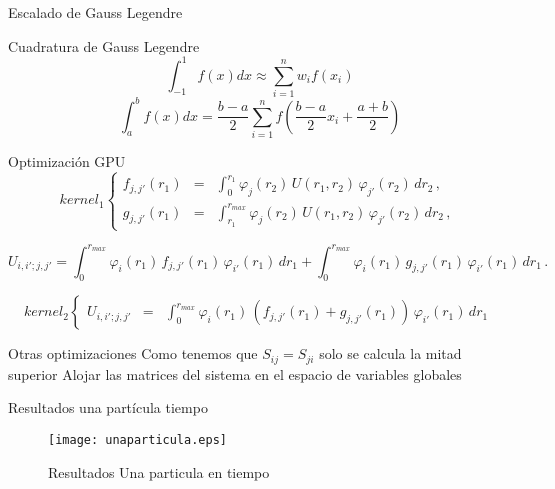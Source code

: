 \documentclass{beamer}
\begin{document}
\begin{frame}{Escalado de Gauss Legendre}{}
  \begin{block}{Cuadratura de Gauss Legendre}
    \begin{displaymath}
      \int_{-1}^{1} f(x) dx \approx \sum_{i=1}^{n}w_if(x_i)
    \end{displaymath}
    \begin{displaymath}
      \int_{a}^{b} f(x) dx = \frac{b-a}{2} \sum_{i=1}^{n}f(\frac{b-a}{2}x_i + \frac{a+b}{2})
    \end{displaymath}
  \end{block}
\end{frame}


\begin{frame}{Optimizaci\'on GPU}{}
  \begin{displaymath}
  kernel_1 \left\lbrace \begin{array}{ccc}
    f_{j,j'}(r_1) &=& \int_0^{r_1} \varphi_j(r_2)\,U(r_1,r_2)\,\varphi_{j'}(r_2)\,dr_2 \,, \\
    g_{j,j'}(r_1) &=& \int_{r_1}^{r_{max}} \varphi_j(r_2)\,U(r_1,r_2)\,\varphi_{j'}(r_2)\,dr_2 \,,
  \end{array} \right.\,
  \end{displaymath}

  \begin{displaymath}
    U_{i,i';j,j'} = \int_0^{r_{max}} \varphi_i(r_1)\,f_{j,j'}(r_1)\,\varphi_{i'}(r_1)\,dr_1 + 
                    \int_0^{r_{max}} \varphi_i(r_1)\,g_{j,j'}(r_1)\,\varphi_{i'}(r_1)\,dr_1\,.
  \end{displaymath}

  \begin{displaymath}
    kernel_2 \left\lbrace \begin{array}{ccc}
    U_{i,i';j,j'} &=& \int_0^{r_{max}} \varphi_i(r_1)\,(f_{j,j'}(r_1) + g_{j,j'}(r_1))\,\varphi_{i'}(r_1)\,dr_1
    \end{array} \right.\,
  \end{displaymath}

\end{frame}

\begin{frame}{Otras optimizaciones}{}
  Como tenemos que $S_{ij} = S_{ji}$ solo se calcula la mitad superior
  Alojar las matrices del sistema en el espacio de variables globales
\end{frame}



\begin{frame}{Resultados una part\'icula tiempo}{}
  \begin{figure}[!tbp]
    \texttt{[image: unaparticula.eps]}
    \caption{Resultados Una particula en tiempo}
  \end{figure}
\end{frame}
\end{document}
